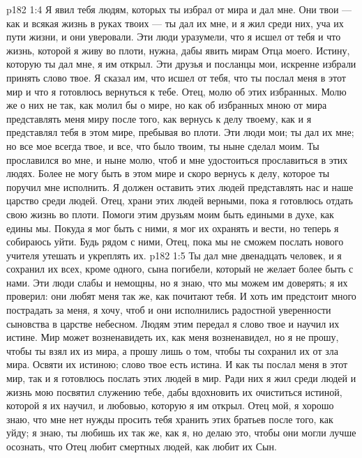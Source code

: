 \vs p182 1:4 Я явил тебя людям, которых ты избрал от мира и дал мне. Они твои --- как и всякая жизнь в руках твоих --- ты дал их мне, и я жил среди них, уча их пути жизни, и они уверовали. Эти люди уразумели, что я исшел от тебя и что жизнь, которой я живу во плоти, нужна, дабы явить мирам Отца моего. Истину, которую ты дал мне, я им открыл. Эти друзья и посланцы мои, искренне избрали принять слово твое. Я сказал им, что исшел от тебя, что ты послал меня в этот мир и что я готовлюсь вернуться к тебе. Отец, молю об этих избранных. Молю же о них не так, как молил бы о мире, но как об избранных мною от мира представлять меня миру после того, как вернусь к делу твоему, как и я представлял тебя в этом мире, пребывая во плоти. Эти люди мои; ты дал их мне; но все мое всегда твое, и все, что было твоим, ты ныне сделал моим. Ты прославился во мне, и ныне молю, чтоб и мне удостоиться прославиться в этих людях. Более не могу быть в этом мире и скоро вернусь к делу, которое ты поручил мне исполнить. Я должен оставить этих людей представлять нас и наше царство среди людей. Отец, храни этих людей верными, пока я готовлюсь отдать свою жизнь во плоти. Помоги этим друзьям моим быть едиными в духе, как едины мы. Покуда я мог быть с ними, я мог их охранять и вести, но теперь я собираюсь уйти. Будь рядом с ними, Отец, пока мы не сможем послать нового учителя утешать и укреплять их.
\vs p182 1:5 Ты дал мне двенадцать человек, и я сохранил их всех, кроме одного, сына погибели, который не желает более быть с нами. Эти люди слабы и немощны, но я знаю, что мы можем им доверять; я их проверил: они любят меня так же, как почитают тебя. И хоть им предстоит много пострадать за меня, я хочу, чтоб и они исполнились радостной уверенности сыновства в царстве небесном. Людям этим передал я слово твое и научил их истине. Мир может возненавидеть их, как меня возненавидел, но я не прошу, чтобы ты взял их из мира, а прошу лишь о том, чтобы ты сохранил их от зла мира. Освяти их истиною; слово твое есть истина. И как ты послал меня в этот мир, так и я готовлюсь послать этих людей в мир. Ради них я жил среди людей и жизнь мою посвятил служению тебе, дабы вдохновить их очиститься истиной, которой я их научил, и любовью, которую я им открыл. Отец мой, я хорошо знаю, что мне нет нужды просить тебя хранить этих братьев после того, как уйду; я знаю, ты любишь их так же, как я, но делаю это, чтобы они могли лучше осознать, что Отец любит смертных людей, как любит их Сын.
